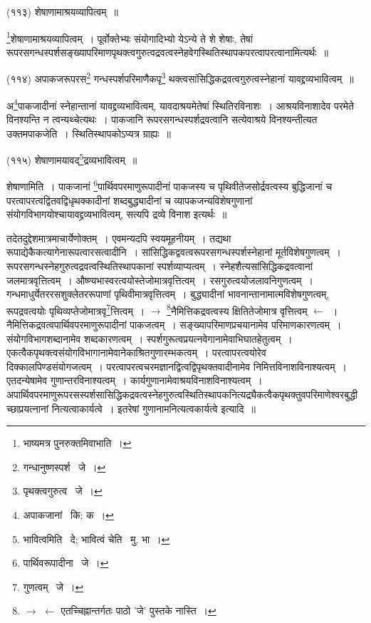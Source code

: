 \documentclass[11pt, openany]{book}
\begin{document}
{{\knu (११३) शेषाणामाश्रयव्यापित्वम्~॥}

\begin{sloppypar}
\renewcommand{\thefootnote}{2}\footnote{भाष्यमत्र पुनरुक्तमिवाभाति~।}{\knu शेषाणामाश्रयव्यापित्वम्~।} पूर्वोक्तेभ्यः संयोगादिभ्यो येऽन्ये ते शे शेषाः, तेषां रूपरसगन्धस्पर्शसङ्ख्यापरिमाणपृथक्त्वगुरुत्वद्रवत्वस्नेहवेगस्थितिस्थापकपरत्वापरत्वानामित्यर्थः~॥
\end{sloppypar}

\begin{sloppypar}
{\knu (११४) अपाकजरूपरस\renewcommand{\thefootnote}{3}\footnote{गन्धानुष्णस्पर्श \textendash\ जे~।} गन्धस्पर्शपरिमाणैकपृ\renewcommand{\thefootnote}{4}\footnote{पृथक्त्वगुरुत्व \textendash\ जे~।} थक्त्वसांसिद्धिकद्रवत्वगुरुत्वस्नेहानां यावद्द्रव्यभावित्वम्~॥}
\end{sloppypar}

अ\renewcommand{\thefootnote}{5}\footnote{अपाकजानां \textendash\ कि; क~।}पाकजादीनां स्नेहान्तानां यावद्द्रव्यभावित्वम्, यावदाश्रयमेतेषां स्थितिरविनाशः~। आश्रयविनाशादेव परमेते विनश्यन्ति न त्वन्यथ्चेत्यथः~। पाकजानि रूपरसगन्धस्पर्शद्रवत्वानि सत्येवाश्रये विनश्यन्तीत्यत उक्तमपाकजेति~। स्थितिस्थापकोऽप्यत्र ग्राह्यः~॥

{\knu (११५) शेषाणामयावद्\renewcommand{\thefootnote}{6}\footnote{भावित्वमिति \textendash\ दे; भावित्वं चेति \textendash\ मु. भा~।}द्रव्यभावित्वम्~॥}

\newpage
{\knu शेषाणामिति~।} पाकजानां \renewcommand{\thefootnote}{1}\footnote{पार्थिवरूपादीना \textendash\ जे~।}पार्थिवपरमाणुरूपादीनां पाकजस्य च पृथिवीतेजसोर्द्रवत्वस्य बुद्धिजानां च परत्वापरत्वद्वितवद्विधृथक्कादीनां शब्दबुद्ध्यादीनां च व्यापकजन्यविशेषगुणानां संयोगविभागयोश्चायावद्द्रव्यभावित्वम्, सत्यपि द्रव्ये विनाश इत्यर्थः~॥

तदेतदुद्देशमात्रमाचार्येणोक्तम्~। एवमन्यदपि स्वयमूहनीयम्~। तद्यथा रूपाद्येकैकत्यागेनारूपत्वारसत्वादीनि~। सांसिद्धिकद्ववत्वरूपरसगन्धस्पर्शस्नेहानां मूर्तविशेषगुणत्वम्~। रूपरसगन्धस्नेहगुरुत्वद्रवत्वस्थितिस्थापकानां स्पर्शव्याप्यत्वम्~। स्नेहशैत्यसांसिद्धिकद्रवत्वानां जलमात्रवृत्तित्वम्~। औष्ण्यभास्वरत्वयोस्तेजोमात्रवृत्तित्वम्~। रसगुरुत्वयोजलावनिगुणत्वम्~। गन्धमाधुर्येतररसशुक्लेतररूपाणां पृथिवीमात्रवृत्तित्वम्~। बुद्ध्यादीनां भावनान्तानामात्मविशेषगुणत्वम्, रूपद्रवत्वयोः पृथिव्यप्तेजोमात्रवृ\renewcommand{\thefootnote}{2}\footnote{गुणत्वम् \textendash\ जे~।}त्तित्वम्~। $\rightarrow$ \renewcommand{\thefootnote}{3}\footnote{$\rightarrow$ $\leftarrow$ एतच्चिह्नान्तर्गतः पाठो 'जे' पुस्तके नास्ति~।}नैमित्तिकद्रवत्वस्य क्षितितेजोमात्र वृत्तित्वम् $\leftarrow$~। नैमित्तिकद्रवत्वपार्थिवपरमाणुरूपादीनां पाकजत्वम्~। सङ्ख्यापरिमाणप्रचयानामेव परिमाणकारणत्वम्~। संयोगविभागशब्दानामेव शब्दकारणत्वम्~। स्पर्शगुरूत्वप्रयत्नवेगानामेवाभिघातहेतुत्वम्~। एकत्वैकपृथक्त्वसंयोगविभागानामेवानेकाश्रितगुणारम्भकत्वम्~। परत्वापरत्वयोरेव दिक्कालपिण्डसंयोगजत्वम्~। परत्वापरत्वचरमज्ञानद्वित्वद्विपृथक्तवादीनामेव निमित्तविनाशविनाश्यत्वम्~। एतदन्येषामेव गुणान्तरविनाश्यत्वम्~। कार्यगुणानामेवाश्रयविनाशविनाश्यत्वम्~। अपार्थिवपरमाणुरूपरसस्पर्शसासिद्धिकद्रवत्वस्नेहगुरुत्वस्थितिस्थापकनित्यद्र्यैकत्वैकपृथक्तुवपरिमाणेश्वरबुद्धीच्छाप्रयत्नानां नित्यत्वाकार्यत्वे~। इतरेषां गुणानामनित्यत्वकार्यत्वे इत्यादि~॥

}
\end{document}
